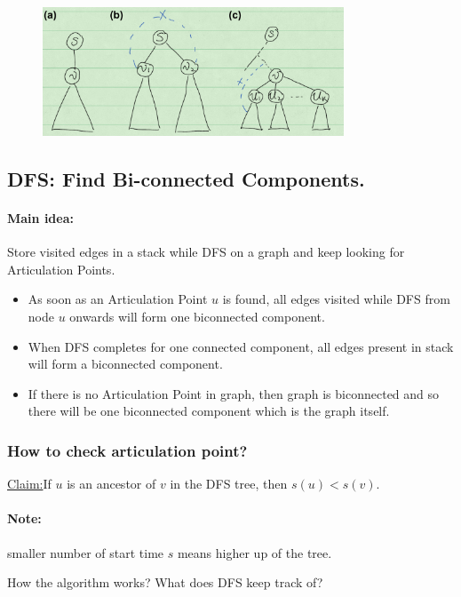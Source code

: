 \documentclass[en,hazy,blue,screen,14pt]{elegantnote}
\newenvironment{claim}[1]{\par\noindent\underline{Claim:}\space#1}{}
\begin{document}
\begin{figure}[H]
\centering
\includegraphics[width=0.8\textwidth]{find-articulation.png}
\end{figure}

\subsection{DFS: Find Bi-connected Components.}
\paragraph{Main idea:} Store visited edges in a stack while DFS on a graph and keep looking for Articulation Points. 
\begin{itemize}
 \item As soon as an Articulation Point $u$ is found, all edges visited while DFS from node $u$ onwards will form one biconnected component. 
 \item When DFS completes for one connected component, all edges present in stack will form a biconnected component.
 \item If there is no Articulation Point in graph, then graph is biconnected and so there will be one biconnected component which is the graph itself.
\end{itemize}

\subsubsection{How to check articulation point?}
\begin{claim}
 If $u$ is an ancestor of $v$ in the DFS tree, then $s(u) < s(v)$.
\end{claim}
\paragraph{Note:} smaller number of start time $s$ means higher up of the tree. 

How the algorithm works? What does DFS keep track of? 
\end{document}
